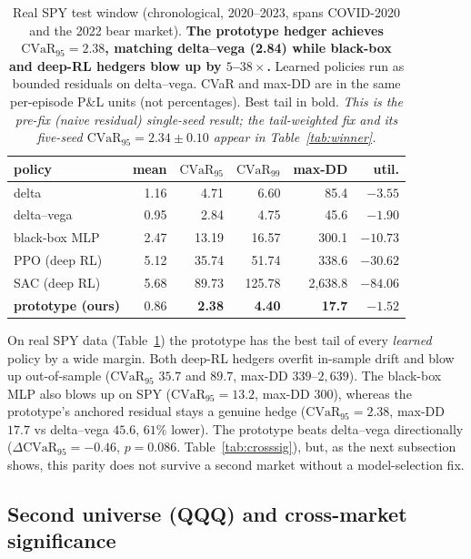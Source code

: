 \documentclass[sigconf,anonymous]{acmart}
\begin{document}
\begin{table}[t]
\centering
\caption{Real SPY test window (chronological, 2020--2023, spans COVID-2020 and
the 2022 bear market). \textbf{The prototype hedger achieves
$\mathrm{CVaR}_{95}=2.38$, matching delta--vega (2.84) while black-box and
deep-RL hedgers blow up by $5$--$38\times$.} Learned policies run as bounded
residuals on delta--vega. CVaR and max-DD are in the same per-episode P\&L units
(not percentages). Best tail in bold. \emph{This is the pre-fix (naive residual)
single-seed result; the tail-weighted fix and its five-seed
$\mathrm{CVaR}_{95}=2.34\!\pm\!0.10$ appear in Table~\ref{tab:winner}.}}
\label{tab:real}
\small
\begin{tabular}{lrrrrr}
\toprule
policy & mean & $\mathrm{CVaR}_{95}$ & $\mathrm{CVaR}_{99}$ & max-DD & util. \\
\midrule
delta          & 1.16 & 4.71  & 6.60   & 85.4   & $-3.55$ \\
delta--vega    & 0.95 & 2.84  & 4.75   & 45.6   & $-1.90$ \\
black-box MLP  & 2.47 & 13.19 & 16.57  & 300.1  & $-10.73$ \\
PPO (deep RL)  & 5.12 & 35.74 & 51.74  & 338.6  & $-30.62$ \\
SAC (deep RL)  & 5.68 & 89.73 & 125.78 & 2{,}638.8 & $-84.06$ \\
\textbf{prototype (ours)} & 0.86 & \textbf{2.38} & \textbf{4.40} & \textbf{17.7} & \textbf{$-1.52$} \\
\bottomrule
\end{tabular}
\end{table}

On real SPY data (Table~\ref{tab:real}) the prototype has the best tail of every
\emph{learned} policy by a wide margin. Both deep-RL hedgers overfit in-sample drift
and blow up out-of-sample ($\mathrm{CVaR}_{95}$ $35.7$ and $89.7$, max-DD $339$--$2{,}639$).
The black-box MLP also blows up on SPY ($\mathrm{CVaR}_{95}=13.2$, max-DD $300$), whereas the prototype's anchored residual stays a
genuine hedge ($\mathrm{CVaR}_{95}=2.38$, max-DD $17.7$ vs delta--vega $45.6$, $61\%$ lower). The prototype beats delta--vega
directionally ($\Delta\mathrm{CVaR}_{95}=-0.46$, $p=0.086$. Table~\ref{tab:crosssig}),
but, as the next subsection shows, this parity does not survive a second market without
a model-selection fix.


\subsection{Second universe (QQQ) and cross-market significance}
\label{sec:qqq}
\end{document}
